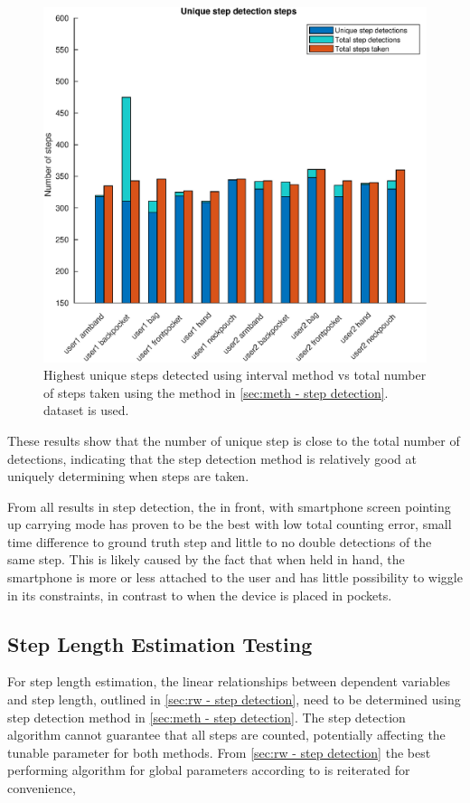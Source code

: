 \begin{figure}[H]
	\centering
	\includegraphics[width=0.7\linewidth]{images/20201127_1626_Unique_step_detection_steps}
	\setlength{\belowcaptionskip}{-10pt}
\caption[False positives and true positives step detection comparison]{Highest unique steps detected using interval method vs total number of steps taken using the method in \cref{sec:meth - step detection}. \citet{Brajdic2013} dataset is used. }
\label{fig:sd_tp_fp_comparison}
\end{figure}

These results show that the number of unique step is close to the total number of detections, indicating that the step detection method is relatively good at uniquely determining when steps are taken. \par 

From all results in step detection, the in front, with smartphone screen pointing up carrying mode has proven to be the best with low total counting error, small time difference to ground truth step and little to no double detections of the same step. This is likely caused by the fact that when held in hand, the smartphone is more or less attached to the user and has little possibility to wiggle in its constraints, in contrast to when the device is placed in pockets. 

\subsection{Step Length Estimation Testing}
\label{sec:results-step_length_estimation}
For step length estimation, the linear relationships between dependent variables and step length, outlined in \cref{sec:rw - step detection}, need to be determined using step detection method in \cref{sec:meth - step detection}. The step detection algorithm cannot guarantee that all steps are counted, potentially affecting the tunable parameter for both methods.  From \cref{sec:rw - step detection} the best performing algorithm for global parameters according to \cite{Vezocnik2019} is reiterated for convenience,

